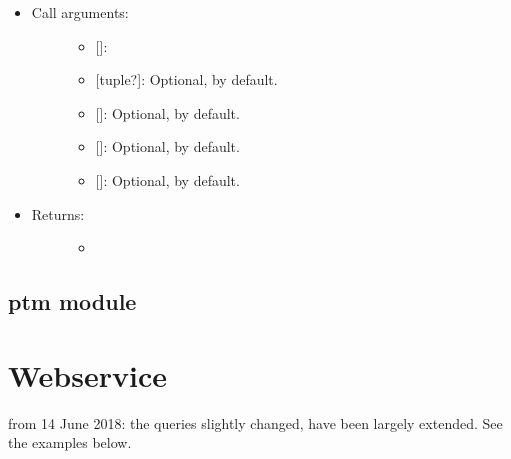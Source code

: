 \documentclass[letterpaper,10pt,english]{sphinxmanual}
\begin{document}
\begin{fulllineitems}
\begin{itemize}
\begin{description}
\end{description}

\item {} \begin{description}
\item[{Call arguments:}] \leavevmode\begin{itemize}
\item {} 
 {[}{]}:

\item {} 
 {[}tuple?{]}: Optional,  by default.

\item {} 
 {[}{]}: Optional,  by default.

\item {} 
 {[}{]}: Optional,  by default.

\item {} 
 {[}{]}: Optional,  by default.

\end{itemize}

\end{description}

\item {} \begin{description}
\item[{Returns:}] \leavevmode\begin{itemize}
\item {} 
\end{itemize}

\end{description}

\end{itemize}

\end{fulllineitems}



\section{ptm module}
\label{\detokenize{reference:module-pypath.ptm}}\label{\detokenize{reference:ptm-module}}

\chapter{Webservice}
\label{\detokenize{webservice:webservice}}\label{\detokenize{webservice::doc}}
 from 14 June 2018: the queries slightly changed, have been
largely extended. See the examples below.
\end{document}
